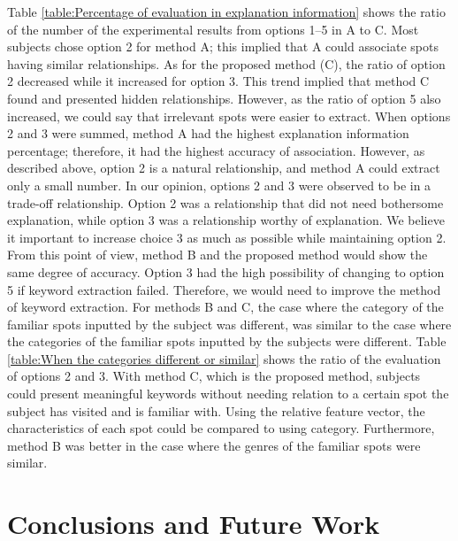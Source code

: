 \documentclass[journal]{IAENGtran}
\begin{document}
   Table \ref{table:Percentage of evaluation in explanation information} shows the ratio of the number of the experimental results from options 1--5 in A to C. Most subjects chose option 2 for method A; this implied that A could associate spots having similar relationships. As for the proposed method (C), the ratio of option 2 decreased while it increased for option 3. This trend implied that method C found and presented hidden relationships. However, as the ratio of option 5 also increased, we could say that irrelevant spots were easier to extract.
   When options 2 and 3 were summed, method A had the highest explanation information percentage; therefore, it had the highest accuracy of association. However, as described above, option 2 is a natural relationship, and method A could extract only a small number. In our opinion, options 2 and 3 were observed to be in a trade-off relationship. Option 2 was a relationship that did not need bothersome explanation, while option 3 was a relationship worthy of explanation. We believe it important to increase choice 3 as much as possible while maintaining option 2. From this point of view, method B and the proposed method would show the same degree of accuracy.
   Option 3 had the high possibility of changing to option 5 if keyword extraction failed. Therefore, we would need to improve the method of keyword extraction.
   For methods B and C, the case where the category of the familiar spots inputted by the subject was different, was similar to the case where the categories of the familiar spots inputted by the subjects were different. Table \ref{table:When the categories different or similar} shows the ratio of the evaluation of options 2 and 3. With method C, which is the proposed method, subjects could present meaningful keywords without needing relation to a certain spot the subject has visited and is familiar with. Using the relative feature vector, the characteristics of each spot could be compared to using category. Furthermore, method B was better in the case where the genres of the familiar spots were similar.
\section{Conclusions and Future Work}
\label{sec:Conclusions and Future Work}
\end{document}

